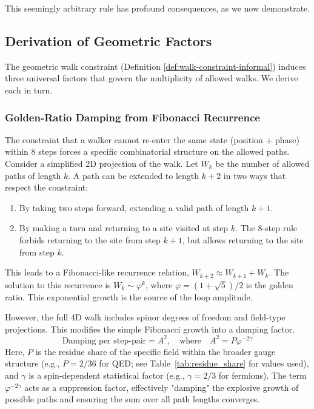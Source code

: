 \documentclass[11pt,a4paper]{article}
\theoremstyle{definition}
\theoremstyle{remark}
\begin{document}
This seemingly arbitrary rule has profound consequences, as we now demonstrate.

\subsection{Derivation of Geometric Factors}

The geometric walk constraint (Definition \ref{def:walk-constraint-informal}) induces three universal factors that govern the multiplicity of allowed walks. We derive each in turn.

\subsubsection{Golden-Ratio Damping from Fibonacci Recurrence}

The constraint that a walker cannot re-enter the same state (position + phase) within 8 steps forces a specific combinatorial structure on the allowed paths. Consider a simplified 2D projection of the walk. Let $W_k$ be the number of allowed paths of length $k$. A path can be extended to length $k+2$ in two ways that respect the constraint:
\begin{enumerate}
    \item By taking two steps forward, extending a valid path of length $k+1$.
    \item By making a turn and returning to a site visited at step $k$. The 8-step rule forbids returning to the site from step $k+1$, but allows returning to the site from step $k$.
\end{enumerate}
This leads to a Fibonacci-like recurrence relation, $W_{k+2} \approx W_{k+1} + W_k$. The solution to this recurrence is $W_k \sim \varphi^k$, where $\varphi = (1+\sqrt{5})/2$ is the golden ratio. This exponential growth is the source of the loop amplitude.

However, the full 4D walk includes spinor degrees of freedom and field-type projections. This modifies the simple Fibonacci growth into a damping factor.
\begin{equation}
\label{eq:damping}
\text{Damping per step-pair} = A^{2}, \quad \text{where} \quad A^2 = P\varphi^{-2\gamma}
\end{equation}
Here, $P$ is the residue share of the specific field within the broader gauge structure (e.g., $P=2/36$ for QED; see Table~\ref{tab:residue_share} for values used), and $\gamma$ is a spin-dependent statistical factor (e.g., $\gamma=2/3$ for fermions). The term $\varphi^{-2\gamma}$ acts as a suppression factor, effectively "damping" the explosive growth of possible paths and ensuring the sum over all path lengths converges.
\end{document}
